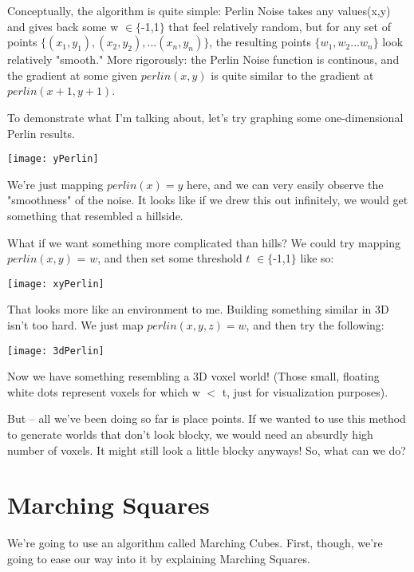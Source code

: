 \documentclass[12pt,twoside]{reedthesis}
\begin{document}
Conceptually, the algorithm is quite simple: Perlin Noise takes any values(x,y) and gives back some w $\in \{$-1,1$\}$ that feel relatively random, but for any set of points $\{(x_1,y_1), (x_2,y_2), ... (x_n,y_n)\}$, the resulting points $\{w_1, w_2... w_n\}$ look relatively "smooth." More rigorously: the Perlin Noise function is continous, and the gradient at some given $perlin(x,y)$ is quite similar to the gradient at $perlin(x+1,y+1)$.

To demonstrate what I'm talking about, let's try graphing some one-dimensional Perlin results.

\texttt{[image: yPerlin]}

We're just mapping $perlin(x) = y$ here, and we can very easily observe the "smoothness" of the noise. It looks like if we drew this out infinitely, we would get something that resembled a hillside.

What if we want something more complicated than hills?
We could try mapping $perlin(x,y)$ = $w$, and then set some threshold $t$ $\in \{$-1,1$\}$ like so:

\begin{algorithm}
\end{algorithm}

\texttt{[image: xyPerlin]}

That looks more like an environment to me.
Building something similar in 3D isn't too hard.
We just map $perlin(x,y,z) = w$, and then try the following:
\begin{algorithm}
\end{algorithm}

\texttt{[image: 3dPerlin]}

Now we have something resembling a 3D voxel world! (Those small, floating white dots represent voxels for which w $<$ t, just for visualization purposes).

But -- all we've been doing so far is place points.
If we wanted to use this method to generate worlds that don't look blocky, we would need an absurdly high number of voxels.
It might still look a little blocky anyways!
So, what can we do?

\section{Marching Squares}
We're going to use an algorithm called Marching Cubes. First, though, we're going to ease our way into it by explaining Marching Squares.
\end{document}
